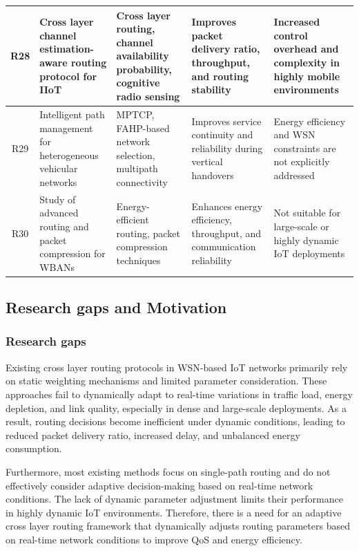 \documentclass[a4paper,fleqn]{cas-dc}
\numberwithin{equation}{section}
\begin{document}
\begin{table}[h]
\begin{tabular}{|c|p{3.7cm}|p{4.5cm}|p{4.5cm}|p{3.7cm}|}
R28 & Cross layer channel estimation-aware routing protocol for IIoT \cite{salih2023dynamic}& Cross layer routing, channel availability probability, cognitive radio sensing & Improves packet delivery ratio, throughput, and routing stability & Increased control overhead and complexity in highly mobile environments \\
\hline

R29 & Intelligent path management for heterogeneous vehicular networks \cite{singh2025study}& MPTCP, FAHP-based network selection, multipath connectivity & Improves service continuity and reliability during vertical handovers & Energy efficiency and WSN constraints are not explicitly addressed \\
\hline

R30 & Study of advanced routing and packet compression for WBANs \cite{hapanchak2024intelligent}& Energy-efficient routing, packet compression techniques & Enhances energy efficiency, throughput, and communication reliability & Not suitable for large-scale or highly dynamic IoT deployments \\
\hline

\end{tabular}
\end{table}
\clearpage

\subsection{Research gaps and Motivation}
\subsubsection{Research gaps}
Existing cross layer routing protocols in WSN-based IoT networks primarily rely on static weighting mechanisms and limited parameter consideration. These approaches fail to dynamically adapt to real-time variations in traffic load, energy depletion, and link quality, especially in dense and large-scale deployments. As a result, routing decisions become inefficient under dynamic conditions, leading to reduced packet delivery ratio, increased delay, and unbalanced energy consumption.

Furthermore, most existing methods focus on single-path routing and do not effectively consider adaptive decision-making based on real-time network conditions. The lack of dynamic parameter adjustment limits their performance in highly dynamic IoT environments. Therefore, there is a need for an adaptive cross layer routing framework that dynamically adjusts routing parameters based on real-time network conditions to improve QoS and energy efficiency.
\end{document}
